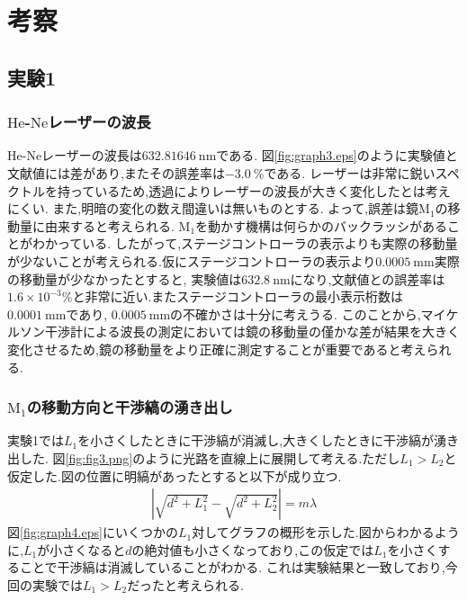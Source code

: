 \section{考察}
\subsection{実験1}
\subsubsection{$\mathrm{He}$-$\mathrm{Ne}$レーザーの波長}
$\mathrm{He}$-$\mathrm{Ne}$レーザーの波長は$632.81646~\si{\nano\metre}$である\cite{kiso}.
図\ref{fig:graph3.eps}のように実験値と文献値には差があり,またその誤差率は$-3.0~\%$である.
レーザーは非常に鋭いスペクトルを持っているため,透過によりレーザーの波長が大きく変化したとは考えにくい.
また,明暗の変化の数え間違いは無いものとする.
よって,誤差は鏡$\mathrm{M_1}$の移動量に由来すると考えられる. $\mathrm{M_1}$を動かす機構は何らかのバックラッシがあることがわかっている.
したがって,ステージコントローラの表示よりも実際の移動量が少ないことが考えられる.仮にステージコントローラの表示より$0.0005~\si{\milli\metre}$実際の移動量が少なかったとすると,
実験値は$632.8~\si{\nano\metre}$になり,文献値との誤差率は$1.6\times10^{-3}\%$と非常に近い.またステージコントローラの最小表示桁数は$0.0001~\si{\milli\metre}$であり, $0.0005~\si{\milli\metre}$の不確かさは十分に考えうる.
このことから,マイケルソン干渉計による波長の測定においては鏡の移動量の僅かな差が結果を大きく変化させるため,鏡の移動量をより正確に測定することが重要であると考えられる.
\subsubsection{$\mathrm{M_1}$の移動方向と干渉縞の湧き出し}
\label{sec:con_wakidasi}
実験1では$L_1$を小さくしたときに干渉縞が消滅し,大きくしたときに干渉縞が湧き出した.
図\ref{fig:fig3.png}のように光路を直線上に展開して考える.ただし$L_1>L_2$と仮定した.図の位置に明縞があったとすると以下が成り立つ.
\begin{align*}
  \left|\sqrt{d^2+L_1^2}-\sqrt{d^2+L_2^2}\right|=m\lambda
\end{align*}
図\ref{fig:graph4.eps}にいくつかの$L_1$対してグラフの概形を示した.図からわかるように,$L_1$が小さくなると$d$の絶対値も小さくなっており,この仮定では$L_1$を小さくすることで干渉縞は消滅していることがわかる.
これは実験結果と一致しており,今回の実験では$L_1>L_2$だったと考えられる.
